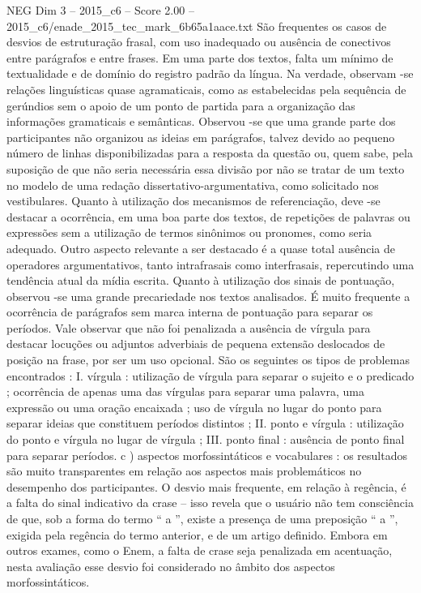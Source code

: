 \begin{textsample}{NEG Dim 3 – 2015\_c6 – Score 2.00 – 2015\_c6/enade\_2015\_tec\_mark\_6b65a1aace.txt}
São frequentes os casos de desvios de estruturação frasal, com uso inadequado ou ausência de conectivos entre parágrafos e entre frases.
Em uma parte dos textos, falta um mínimo de textualidade e de domínio do registro padrão da língua.
Na verdade, observam -se relações linguísticas quase agramaticais, como as estabelecidas pela sequência de gerúndios sem o apoio de um ponto de partida para a organização das informações gramaticais e semânticas.
Observou -se que uma grande parte dos participantes não organizou as ideias em parágrafos, talvez devido ao pequeno número de linhas disponibilizadas para a resposta da questão ou, quem sabe, pela suposição de que não seria necessária essa divisão por não se tratar de um texto no modelo de uma redação dissertativo-argumentativa, como solicitado nos vestibulares.
Quanto à utilização dos mecanismos de referenciação, deve -se destacar a ocorrência, em uma boa parte dos textos, de repetições de palavras ou expressões sem a utilização de termos sinônimos ou pronomes, como seria adequado.
Outro aspecto relevante a ser destacado é a quase total ausência de operadores argumentativos, tanto intrafrasais como interfrasais, repercutindo uma tendência atual da mídia escrita.
Quanto à utilização dos sinais de pontuação, observou -se uma grande precariedade nos textos analisados.
É muito frequente a ocorrência de parágrafos sem marca interna de pontuação para separar os períodos.
Vale observar que não foi penalizada a ausência de vírgula para destacar locuções ou adjuntos adverbiais de pequena extensão deslocados de posição na frase, por ser um uso opcional.
São os seguintes os tipos de problemas encontrados : I. vírgula : utilização de vírgula para separar o sujeito e o predicado ; ocorrência de apenas uma das vírgulas para separar uma palavra, uma expressão ou uma oração encaixada ; uso de vírgula no lugar do ponto para separar ideias que constituem períodos distintos ; II. ponto e vírgula : utilização do ponto e vírgula no lugar de vírgula ; III. ponto final : ausência de ponto final para separar períodos. c ) aspectos morfossintáticos e vocabulares : os resultados são muito transparentes em relação aos aspectos mais problemáticos no desempenho dos participantes.
O desvio mais frequente, em relação à regência, é a falta do sinal indicativo da crase – isso revela que o usuário não tem consciência de que, sob a forma do termo “ a ”, existe a presença de uma preposição “ a ”, exigida pela regência do termo anterior, e de um artigo definido.
Embora em outros exames, como o Enem, a falta de crase seja penalizada em acentuação, nesta avaliação esse desvio foi considerado no âmbito dos aspectos morfossintáticos.

\end{textsample}
